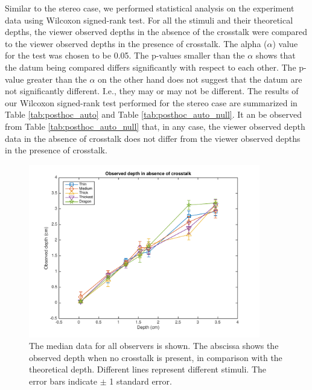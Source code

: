 Similar to the stereo case, we performed statistical analysis on the experiment data using Wilcoxon signed-rank test. For all the stimuli and their theoretical depths, the viewer observed depths in the absence of the crosstalk were compared to the viewer observed depths in the presence of crosstalk. The alpha ($\alpha$) value for the test was chosen to be 0.05. The p-values smaller than the $\alpha$ shows that the datum being compared differs significantly with respect to each other. The p-value greater than the $\alpha$ on the other hand does not suggest that the datum are not significantly different. I.e., they may or may not be different. The results of our Wilcoxon signed-rank test performed for the stereo case are summarized in Table \ref{tab:posthoc_auto} and Table \ref{tab:posthoc_auto_null}. It an be observed from Table \ref{tab:posthoc_auto_null} that, in any case, the viewer observed depth data in the absence of crosstalk does not differ from the viewer observed depths in the presence of crosstalk. 
\begin{figure}[H]
\centering
    \includegraphics[width=0.9\textwidth]{./Template_Figures/a_crosstalk_0}
    \caption{The median data for all observers is shown. The abscissa shows the observed depth when no crosstalk is present, in comparison with the theoretical depth. Different lines represent different stimuli. The error bars indicate $\pm$ 1 standard error.\label{fig:a_crosstalk_0}}
\end{figure}

